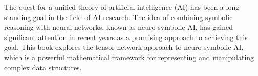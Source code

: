 %
%

\preface

The quest for a unified theory of artificial intelligence (AI) has been a long-standing goal in the field of AI research.
The idea of combining symbolic reasoning with neural networks, known as neuro-symbolic AI, has gained significant attention in recent years as a promising approach to achieving this goal.
This book explores the tensor network approach to neuro-symbolic AI, which is a powerful mathematical framework for representing and manipulating complex data structures.



%
%
%
%
%


